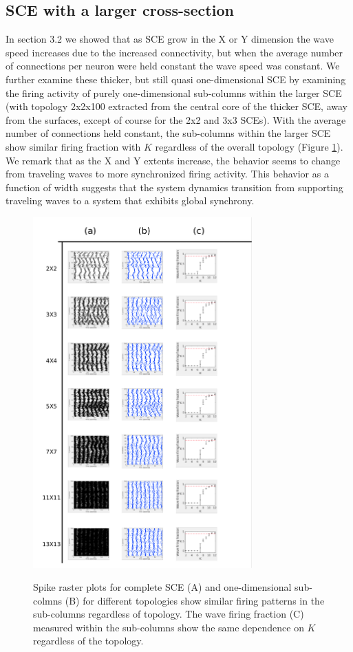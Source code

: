 \documentclass[12pt]{article}
\begin{document}
\clearpage
\subsection*{SCE with a larger cross-section}
In section 3.2 we showed that as SCE grow in the X or Y dimension the wave speed increases due to the increased connectivity, but when the average number of connections per neuron were held constant the wave speed was constant.
We further examine these thicker, but still quasi one-dimensional SCE by examining the firing activity of purely one-dimensional sub-columns within the larger SCE (with topology 2x2x100 extracted from the central core of the thicker SCE, away from the surfaces, except of course for the 2x2 and 3x3 SCEs).
With the average number of connections held constant, the sub-columns within the larger SCE show similar firing fraction with $K$ regardless of the overall topology (Figure \ref{fig:LargeSCESubcolumns}).
We remark that as the X and Y extents increase, the behavior seems to change from traveling waves to more synchronized firing activity.
This behavior as a function of width suggests that the system dynamics transition from supporting traveling waves to a system that exhibits global synchrony.
\begin{figure}[!htb]
 \caption{ Spike raster plots for complete SCE (A) and one-dimensional sub-colmns (B) for different topologies show similar firing patterns in the sub-columns regardless  of topology. 
           The wave firing fraction (C) measured within the sub-columns show the same dependence on $K$ regardless of the topology.}
   \includegraphics[width=0.75\textwidth]{fig/WaveFractionVsThick}
   \label{fig:LargeSCESubcolumns}
\end{figure}
\FloatBarrier

\color{black}
\end{document}
